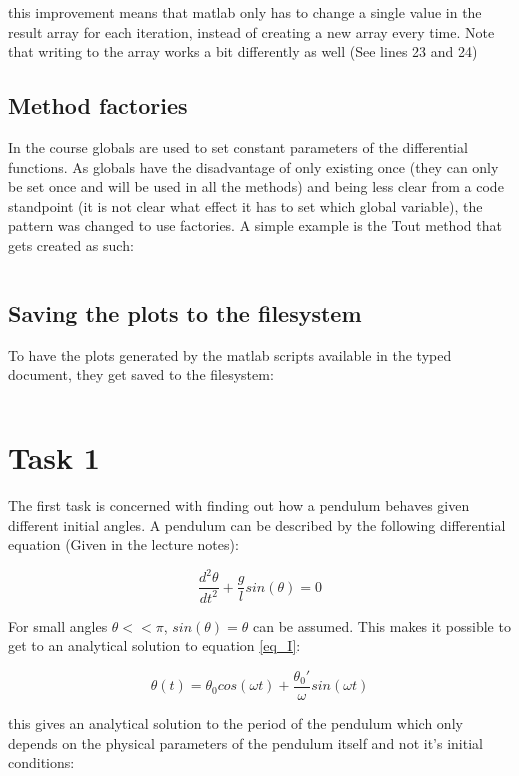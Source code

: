 \documentclass[14pt]{article}
\begin{document}
this improvement means that matlab only has to change a single value in the result array for each iteration, instead of creating a new array every time.
Note that writing to the array works a bit differently as well (See lines 23 and 24)

\subsection{Method factories}
In the course globals are used to set constant parameters of the differential functions. 
As globals have the disadvantage of only existing once (they can only be set once and will be used in all the methods) and being less clear from a code standpoint
(it is not clear what effect it has to set which global variable), the pattern was changed to use factories. A simple example is the Tout method that gets created as such:
\inputminted[linenos, firstline=1, lastline=16]{octave}{./matlab/make_Tout.m}

\subsection{Saving the plots to the filesystem}
To have the plots generated by the matlab scripts available in the typed document, they get saved to the filesystem:
\inputminted[linenos, firstline=51, lastline=51]{octave}{./matlab/assignment_2.m}

\section{Task 1}
The first task is concerned with finding out how a pendulum behaves given different initial angles. A pendulum can be described by the following
differential equation (Given in the lecture notes):

\begin{equation}\label{eq_I}
  \frac{d^2 \theta}{d t^2} + \frac{g}{l}sin(\theta) = 0
\end{equation}

For small angles $\theta << \pi$, $sin(\theta) = \theta$ can be assumed. This makes it possible to get to an
analytical solution to equation \ref{eq_I}:

$$
\theta(t) = \theta_0 cos(\omega t) + \frac{\theta_0'}{\omega} sin(\omega t) 
$$

this gives an analytical solution to the period of the pendulum which only depends on the physical parameters of the pendulum
itself and not it's initial conditions:
\end{document}
